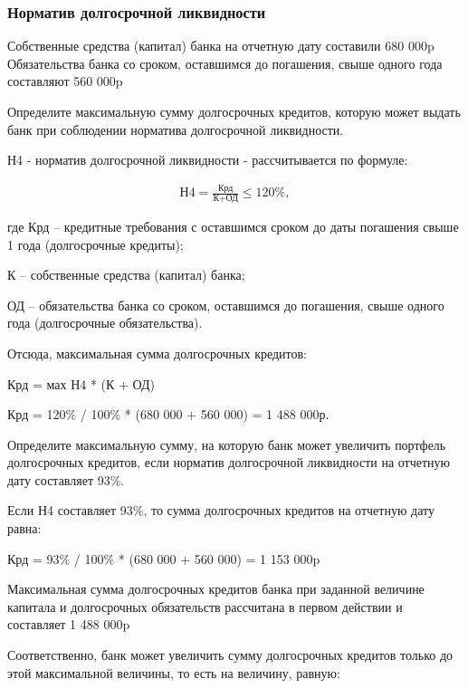 \documentclass[12pt, table, a4paper,twoside]{exam}
\begin{document}
\begin{questions}
\subsubsection{Норматив долгосрочной ликвидности}
\question[10] Собственные средства (капитал) банка на отчетную дату составили 680 000p Обязательства банка со сроком, оставшимся до погашения, свыше одного года составляют 560 000p 
\noaddpoints

\begin{subparts}
	\subpart[5] Определите	максимальную сумму долгосрочных кредитов, которую может выдать банк при соблюдении норматива долгосрочной ликвидности.
	
	\begin{solution}[12em]
		Н4 - норматив долгосрочной ликвидности - рассчитывается по формуле:
		
		\begin{align}
		\text{Н4} = \frac{\text{Крд}}{\text{К} + \text{ОД}} \leq 120\%,
		\end{align}
		
		где Крд – кредитные требования с оставшимся сроком до даты погашения свыше 1 года (долгосрочные кредиты);
		
		К – собственные средства (капитал) банка;
		
		ОД – обязательства банка со сроком, оставшимся до погашения, свыше одного года (долгосрочные обязательства).
		
		Отсюда, максимальная сумма долгосрочных кредитов:
		
		Крд = мах Н4 * (К + ОД)
		
		Крд = 120\% / 100\% * (680 000 + 560 000) = 1 488 000р.
		
	\end{solution}
	
	\subpart[5] Определите	максимальную сумму, на которую банк может увеличить портфель долгосрочных кредитов, если норматив долгосрочной ликвидности на отчетную дату составляет 93\%.
		
	\begin{solution}[12em]
		Если Н4 составляет 93\%, то сумма долгосрочных кредитов на отчетную дату равна:
		
		Крд = 93\% / 100\% * (680 000 + 560 000) = 1 153 000p
		
		Максимальная сумма долгосрочных кредитов банка при заданной величине капитала и долгосрочных обязательств рассчитана в первом действии и составляет 1 488 000p
		
		Соответственно, банк может увеличить сумму долгосрочных кредитов только до этой максимальной величины, то есть на величину, равную:
		

\end{solution}
\end{subparts}
\end{questions}
\end{document}
